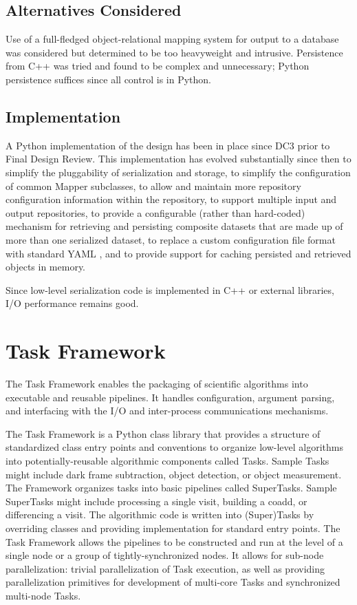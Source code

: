 \documentclass[DM,toc]{lsstdoc}
\begin{document}
\subsection{Alternatives Considered}\label{alternatives-considered}

Use of a full-fledged object-relational mapping system for output to a
database was considered but determined to be too heavyweight and
intrusive. Persistence from C++ was tried and found to be complex and
unnecessary; Python persistence suffices since all control is in Python.

\subsection{Implementation}\label{butler-implementation}

A Python implementation of the design has been in place since DC3 prior to
Final Design Review.  This implementation has evolved substantially since then
to simplify the pluggability of serialization and storage, to simplify the
configuration of common Mapper subclasses, to allow and maintain more
repository configuration information within the repository, to support multiple
input and output repositories, to provide a configurable (rather than
hard-coded) mechanism for retrieving and persisting composite datasets that are
made up of more than one serialized dataset, to replace a custom configuration
file format with standard YAML \citep{YAML}, and to provide support for caching
persisted and retrieved objects in memory.

Since low-level serialization code is implemented in C++ or external libraries,
I/O performance remains good.


\section{Task Framework}\label{task-framework}

The Task Framework enables the packaging of scientific algorithms into
executable and reusable pipelines. It handles configuration, argument parsing,
and interfacing with the I/O and inter-process communications mechanisms.

The Task Framework is a Python class library that provides a structure of
standardized class entry points and conventions to organize low-level
algorithms into potentially-reusable algorithmic components called Tasks.
Sample Tasks might include dark frame subtraction, object detection, or object
measurement.  The Framework organizes tasks into basic pipelines called
SuperTasks.  Sample SuperTasks might include processing a single visit,
building a coadd, or differencing a visit. The algorithmic code is written into
(Super)Tasks by overriding classes and providing implementation for standard
entry points. The Task Framework allows the pipelines to be constructed and run
at the level of a single node or a group of tightly-synchronized nodes. It
allows for sub-node parallelization: trivial parallelization of Task execution,
as well as providing parallelization primitives for development of multi-core
Tasks and synchronized multi-node Tasks.
\end{document}
